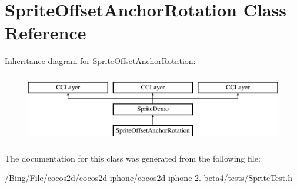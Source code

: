 \hypertarget{interface_sprite_offset_anchor_rotation}{\section{Sprite\-Offset\-Anchor\-Rotation Class Reference}
\label{interface_sprite_offset_anchor_rotation}
}
Inheritance diagram for Sprite\-Offset\-Anchor\-Rotation\-:\begin{figure}[H]
\begin{center}
\leavevmode
\includegraphics[height=3.000000cm]{interface_sprite_offset_anchor_rotation}
\end{center}
\end{figure}


The documentation for this class was generated from the following file\-:\begin{DoxyCompactItemize}
\item 
/\-Bing/\-File/cocos2d/cocos2d-\/iphone/cocos2d-\/iphone-\/2.-\/beta4/tests/Sprite\-Test.\-h\end{DoxyCompactItemize}
